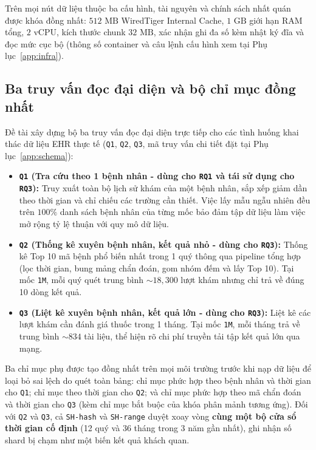 Trên mọi nút dữ liệu thuộc ba cấu hình, tài nguyên và chính sách nhất quán được khóa đồng nhất: $512\text{ MB}$ WiredTiger Internal Cache, $1\text{ GB}$ giới hạn RAM tổng, $2\text{ vCPU}$, kích thước chunk $32\text{ MB}$, xác nhận ghi đa số kèm nhật ký đĩa và đọc mức cục bộ (thông số container và câu lệnh cấu hình xem tại Phụ lục~\ref{app:infra}).

\subsection{Ba truy vấn đọc đại diện và bộ chỉ mục đồng nhất}

Đề tài xây dựng bộ ba truy vấn đọc đại diện trực tiếp cho các tình huống khai thác dữ liệu EHR thực tế (\texttt{Q1}, \texttt{Q2}, \texttt{Q3}, mã truy vấn chi tiết đặt tại Phụ lục~\ref{app:schema}):

\begin{itemize}[leftmargin=0.8cm, itemsep=4pt]
  \item \textbf{\texttt{Q1} (Tra cứu theo 1 bệnh nhân - dùng cho \texttt{RQ1} và tái sử dụng cho \texttt{RQ3}):} Truy xuất toàn bộ lịch sử khám của một bệnh nhân, sắp xếp giảm dần theo thời gian và chỉ chiếu các trường cần thiết. Việc lấy mẫu ngẫu nhiên đều trên $100\%$ danh sách bệnh nhân của từng mốc bảo đảm tập dữ liệu làm việc mở rộng tỷ lệ thuận với quy mô dữ liệu.
  \item \textbf{\texttt{Q2} (Thống kê xuyên bệnh nhân, kết quả nhỏ - dùng cho \texttt{RQ3}):} Thống kê Top 10 mã bệnh phổ biến nhất trong 1 quý thông qua pipeline tổng hợp (lọc thời gian, bung mảng chẩn đoán, gom nhóm đếm và lấy Top 10). Tại mốc \texttt{1M}, mỗi quý quét trung bình $\sim 18{,}300$ lượt khám nhưng chỉ trả về đúng 10 dòng kết quả.
  \item \textbf{\texttt{Q3} (Liệt kê xuyên bệnh nhân, kết quả lớn - dùng cho \texttt{RQ3}):} Liệt kê các lượt khám cần đánh giá thuốc trong 1 tháng. Tại mốc \texttt{1M}, mỗi tháng trả về trung bình $\sim 834$ tài liệu, thể hiện rõ chi phí truyền tải tập kết quả lớn qua mạng.
\end{itemize}

Ba chỉ mục phụ được tạo đồng nhất trên mọi môi trường trước khi nạp dữ liệu để loại bỏ sai lệch do quét toàn bảng: chỉ mục phức hợp theo bệnh nhân và thời gian cho \texttt{Q1}; chỉ mục theo thời gian cho \texttt{Q2}; và chỉ mục phức hợp theo mã chẩn đoán và thời gian cho \texttt{Q3} (kèm chỉ mục bắt buộc của khóa phân mảnh tương ứng). Đối với \texttt{Q2} và \texttt{Q3}, cả \texttt{SH-hash} và \texttt{SH-range} duyệt xoay vòng \textbf{cùng một bộ cửa sổ thời gian cố định} (12 quý và 36 tháng trong 3 năm gần nhất), ghi nhận số shard bị chạm như một biến kết quả khách quan.

